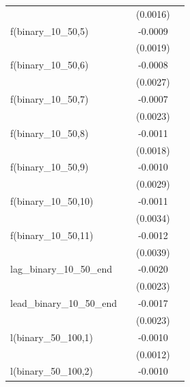 \begin{tabular}{lccc}
                                    &          & (0.0016)              &   \\   
   f(binary\_10\_50,5)              &          & -0.0009               &   \\   
                                    &          & (0.0019)              &   \\   
   f(binary\_10\_50,6)              &          & -0.0008               &   \\   
                                    &          & (0.0027)              &   \\   
   f(binary\_10\_50,7)              &          & -0.0007               &   \\   
                                    &          & (0.0023)              &   \\   
   f(binary\_10\_50,8)              &          & -0.0011               &   \\   
                                    &          & (0.0018)              &   \\   
   f(binary\_10\_50,9)              &          & -0.0010               &   \\   
                                    &          & (0.0029)              &   \\   
   f(binary\_10\_50,10)             &          & -0.0011               &   \\   
                                    &          & (0.0034)              &   \\   
   f(binary\_10\_50,11)             &          & -0.0012               &   \\   
                                    &          & (0.0039)              &   \\   
   lag\_binary\_10\_50\_end         &          & -0.0020               &   \\   
                                    &          & (0.0023)              &   \\   
   lead\_binary\_10\_50\_end        &          & -0.0017               &   \\   
                                    &          & (0.0023)              &   \\   
   l(binary\_50\_100,1)             &          & -0.0010               &   \\   
                                    &          & (0.0012)              &   \\   
   l(binary\_50\_100,2)             &          & -0.0010               &   \\   

\end{tabular}
